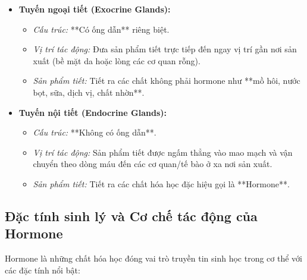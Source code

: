 \begin{itemize}
    \item \textbf{Tuyến ngoại tiết (Exocrine Glands):}
    \begin{itemize}
        \item \textit{Cấu trúc:} **Có ống dẫn** riêng biệt.
        \item \textit{Vị trí tác động:} Đưa sản phẩm tiết trực tiếp đến ngay vị trí gần nơi sản xuất (bề mặt da hoặc lòng các cơ quan rỗng).
        \item \textit{Sản phẩm tiết:} Tiết ra các chất không phải hormone như **mồ hôi, nước bọt, sữa, dịch vị, chất nhờn**.
    \end{itemize}

    \item \textbf{Tuyến nội tiết (Endocrine Glands):}
    \begin{itemize}
        \item \textit{Cấu trúc:} **Không có ống dẫn**.
        \item \textit{Vị trí tác động:} Sản phẩm tiết được ngấm thẳng vào mao mạch và vận chuyển theo dòng máu đến các cơ quan/tế bào ở xa nơi sản xuất.
        \item \textit{Sản phẩm tiết:} Tiết ra các chất hóa học đặc hiệu gọi là **Hormone**.
    \end{itemize}
\end{itemize}

\subsection{Đặc tính sinh lý và Cơ chế tác động của Hormone}

Hormone là những chất hóa học đóng vai trò truyền tin sinh học trong cơ thể với các đặc tính nổi bật:

